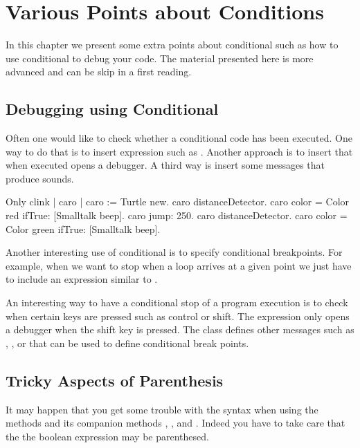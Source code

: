 \ifx\wholebook\relax\else



\fi

\chapter{Various Points about Conditions}\label{cha:otherCondition}

In this chapter we present some extra points about conditional such as how to use conditional to debug your code. The material presented here is more advanced and can be skip in a first reading. 

\section{Debugging using Conditional}
Often one would like to check whether a conditional code has been executed. One way to do that is to insert expression such as . Another approach is to insert  that when executed opens a debugger. A third way is insert some messages that produce sounds. 

\begin{scriptwithtitle}{Only clink}\label{scr:onlyclink}
| caro |
caro := Turtle new.
caro distanceDetector.
caro color = Color red
   ifTrue: [Smalltalk beep].
caro jump: 250.
caro distanceDetector.
caro color = Color green
   ifTrue: [Smalltalk beep].
\end{scriptwithtitle}
      
      
Another interesting use of conditional is to specify conditional breakpoints. For example, when we want to stop when a loop arrives at a given point we just have to include an expression similar to .

An interesting way to have a conditional stop of a program execution is to check when certain keys are pressed such as control or shift. The expression  only opens a debugger when the shift key is pressed. The class  defines other messages such as , , or  that can be used to define conditional break points.
      


\section{Tricky Aspects of Parenthesis}\label{sec:conditionTricky}
It may happen that you get some trouble with the syntax when using the methods  
and its companion methods , , and . Indeed you 
have to take care that the the boolean expression may be parenthesed. 

